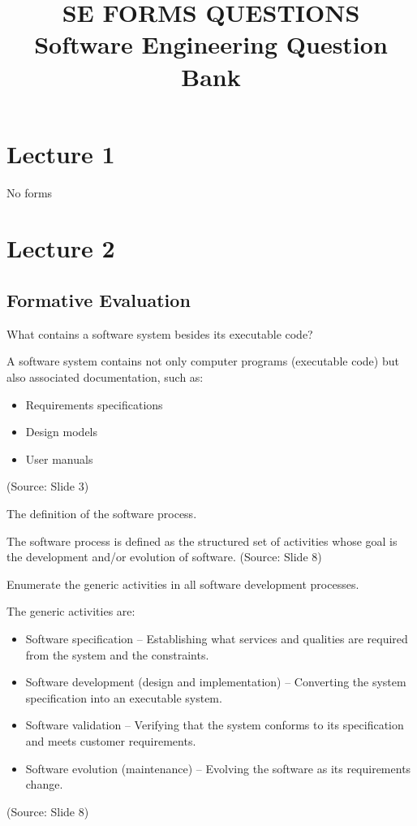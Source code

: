 \documentclass[12pt]{article}
\title{\textbf{\Large SE FORMS QUESTIONS}\\[0.5em]\large Software Engineering Question Bank}
\author{}
\date{}
\begin{document}
\maketitle

\section{Lecture 1}
No forms

\section{Lecture 2}

\subsection{Formative Evaluation}

\begin{questionbox}
What contains a software system besides its executable code?
\end{questionbox}

A software system contains not only computer programs (executable code) but also associated documentation, such as:
\begin{itemize}
    \item Requirements specifications
    \item Design models
    \item User manuals
\end{itemize}
(Source: Slide 3)

\begin{questionbox}
The definition of the software process.
\end{questionbox}

The software process is defined as the structured set of activities whose goal is the development and/or evolution of software.
(Source: Slide 8)

\begin{questionbox}
Enumerate the generic activities in all software development processes.
\end{questionbox}

The generic activities are:
\begin{itemize}
    \item Software specification -- Establishing what services and qualities are required from the system and the constraints.
    \item Software development (design and implementation) -- Converting the system specification into an executable system.
    \item Software validation -- Verifying that the system conforms to its specification and meets customer requirements.
    \item Software evolution (maintenance) -- Evolving the software as its requirements change.
\end{itemize}
(Source: Slide 8)
\end{document}
